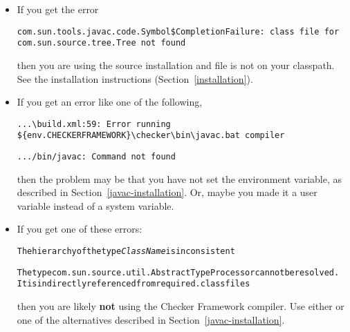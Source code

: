\begin{itemize}
\item
If you get the error

\begin{smaller}
\begin{Verbatim}
com.sun.tools.javac.code.Symbol$CompletionFailure: class file for com.sun.source.tree.Tree not found
\end{Verbatim}
\end{smaller}

\noindent
then you are using the source installation and file  is not
on your classpath.  See the installation instructions
(Section~\ref{installation}).

\item
If you get an error like one of the following,

\begin{smaller}
\begin{Verbatim}
...\build.xml:59: Error running ${env.CHECKERFRAMEWORK}\checker\bin\javac.bat compiler
\end{Verbatim}

\begin{Verbatim}
.../bin/javac: Command not found
\end{Verbatim}
\end{smaller}

\noindent
then the problem may be that you have not set the  environment
variable, as described in Section~\ref{javac-installation}.  Or, maybe
you made it a user variable instead of a system variable.

\item
If you get one of these errors:

\begin{alltt}
The hierarchy of the type \emph{ClassName} is inconsistent

The type com.sun.source.util.AbstractTypeProcessor cannot be resolved.
  It is indirectly referenced from required .class files
\end{alltt}

\begin{sloppypar}
\noindent
then you are likely \textbf{not} using the Checker Framework compiler.  Use
either  or one of the alternatives
described in Section~\ref{javac-installation}.
\end{sloppypar}



\end{itemize}
